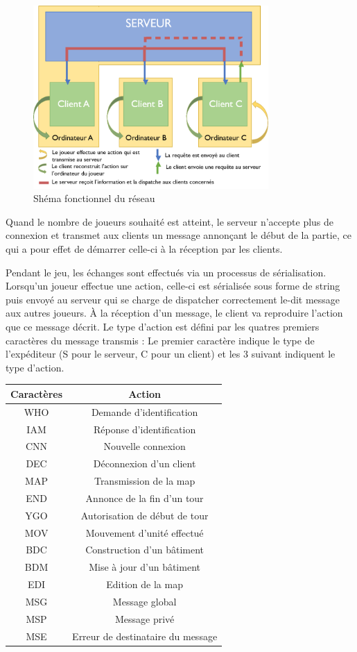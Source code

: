 \documentclass[12pt]{report}
\begin{document}
\begin{figure}[H]
    \centering
    \includegraphics[width=0.8\textwidth]{multiplayer}
    \caption{Shéma fonctionnel du réseau}
\end{figure}

Quand le nombre de joueurs souhaité est atteint, le serveur n'accepte plus de connexion et transmet aux clients un message annonçant le début de la partie, ce qui a pour effet de démarrer celle-ci à la réception par les clients.

Pendant le jeu, les échanges sont effectués via un processus de sérialisation. Lorsqu’un joueur effectue une action, celle-ci est sérialisée sous forme de string puis envoyé au serveur qui se charge de dispatcher correctement le-dit message aux autres joueurs. À la réception d’un message, le client va reproduire l’action que ce message décrit. Le type d’action est défini par les quatres premiers caractères du message transmis : Le premier caractère indique le type de l’expéditeur (S pour le serveur, C pour un client) et les 3 suivant indiquent le type d’action.

\begin{center}
	\begin{tabular}{c|c}
		\toprule
		\textbf{Caractères}  & \textbf{Action}\\ 
		\midrule
		WHO & Demande d’identification \\
		IAM & Réponse d'identification \\
		CNN & Nouvelle connexion \\
		DEC & Déconnexion d’un client \\
		MAP & Transmission de la map \\
		END & Annonce de la fin d’un tour \\
		YGO & Autorisation de début de tour\\
		MOV & Mouvement d’unité effectué\\
		BDC & Construction d’un bâtiment\\
		BDM & Mise à jour d’un bâtiment\\
		EDI & Edition de la map\\
		MSG & Message global\\
		MSP & Message privé\\
		MSE & Erreur de destinataire du message\\
		\bottomrule
	\end{tabular}
\end{center}
\end{document}
